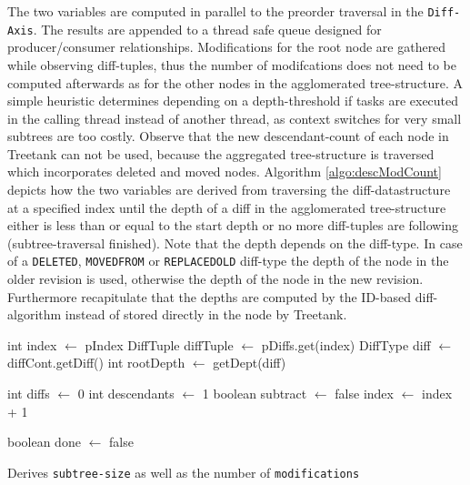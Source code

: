 The two variables are computed in parallel to the preorder traversal in the \texttt{Diff-Axis}. The results are appended to a thread safe queue designed for producer/consumer relationships. Modifications for the root node are gathered while observing diff-tuples, thus the number of modifcations does not need to be computed afterwards as for the other nodes in the agglomerated tree-structure. A simple heuristic determines depending on a depth-threshold if tasks are executed in the calling thread instead of another thread, as context switches for very small subtrees are too costly. Observe that the new descendant-count of each node in Treetank can not be used, because the aggregated tree-structure is traversed which incorporates deleted and moved nodes. Algorithm \ref{algo:descModCount} depicts how the two variables are derived from traversing the diff-datastructure at a specified index until the depth of a diff in the agglomerated tree-structure either is less than or equal to the start depth or no more diff-tuples are following (subtree-traversal finished). Note that the depth depends on the diff-type. In case of a \texttt{DELETED}, \texttt{MOVEDFROM} or \texttt{REPLACEDOLD} diff-type the depth of the node in the older revision is used, otherwise the depth of the node in the new revision. Furthermore recapitulate that the depths are computed by the ID-based diff-algorithm instead of stored directly in the node by Treetank.

\begin{algorithm}[tb]
{}
\BlankLine
int index $\leftarrow$ pIndex\;
DiffTuple diffTuple $\leftarrow$ pDiffs.get(index)\;
DiffType diff $\leftarrow$ diffCont.getDiff()\;
int rootDepth $\leftarrow$ getDept(diff)\;

int diffs $\leftarrow$ 0\;
int descendants $\leftarrow$ 1\;
boolean subtract $\leftarrow$ false\;
index $\leftarrow$ index + 1\;


boolean done $\leftarrow$ false\;
\caption{Derives \texttt{subtree-size} as well as the number of \texttt{modifications}}\label{algo:descModCount}
\end{algorithm}

